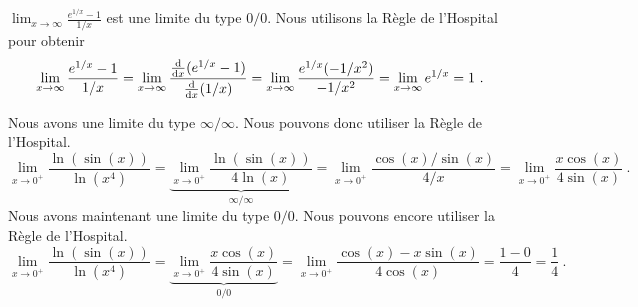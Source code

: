 {
$\displaystyle \lim_{x\to \infty} \frac{e^{1/x}-1}{1/x}$ est une limite du
type $0/0$.  Nous utilisons la Règle de l'Hospital pour obtenir
\[
\lim_{x\to \infty} \frac{e^{1/x}-1}{1/x} =
\lim_{x\to \infty} \frac{\dfdx{(e^{1/x}-1)}{x}}{\dfdx{(1/x)}{x}} =
\lim_{x\to \infty} \frac{ e^{1/x} (-1/x^2)}{-1/x^2} =
\lim_{x\to \infty} e^{1/x} = 1 \ .
\]

 Nous avons une limite du type $\infty/\infty$.  Nous pouvons donc
utiliser la Règle de l'Hospital.
\[
\lim_{x\to 0^+} \frac{\ln(\sin(x))}{\ln(x^4)}
= \underbrace{\lim_{x\to 0^+} \frac{\ln(\sin(x))}{4\ln(x)}}_{\infty/\infty}
= \lim_{x\to 0^+} \frac{\cos(x)/\sin(x)}{4/x}
= \lim_{x\to 0^+} \frac{x\cos(x)}{4\sin(x)} \ .
\]
Nous avons maintenant une limite du type $0/0$.  Nous pouvons encore utiliser la
Règle de l'Hospital.
\[
\lim_{x\to 0^+} \frac{\ln(\sin(x))}{\ln(x^4)}
= \underbrace{\lim_{x\to 0^+} \frac{x\cos(x)}{4\sin(x)}}_{0/0}
= \lim_{x\to 0^+} \frac{\cos(x)-x\sin(x)}{4\cos(x)}
= \frac{1-0}{4} = \frac{1}{4} \ .
\]
}

